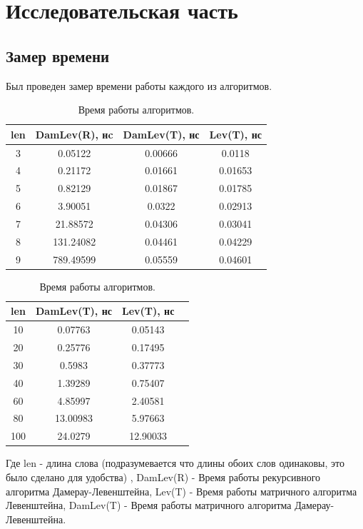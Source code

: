 \documentclass[12pt]{report}
\begin{document}
    \chapter{Исследовательская часть}
    
    \section{Замер времени}
    
    Был проведен замер времени работы каждого из алгоритмов.
    
   \begin{table}[h]
   	\caption{\label{tab:time1} Время работы алгоритмов. }
   	\begin{center}
   		\begin{tabular}{|c|c|c|c|}
    		\hline
    		len & DamLev(R), нc & DamLev(T), нс & Lev(T), нс \\ [0.5ex] 
    		\hline
    		3 & 0.05122 & 0.00666 & 0.0118\\
    		\hline
    		4 & 0.21172 & 0.01661 & 0.01653\\
    		\hline
    		5 & 0.82129 & 0.01867 & 0.01785\\
    		\hline
    		6 & 3.90051 & 0.0322 & 0.02913\\
    		\hline
    		7 & 21.88572 & 0.04306 & 0.03041\\
    		\hline
    		8 & 131.24082 & 0.04461 & 0.04229\\
    		\hline
    		9 & 789.49599 & 0.05559 & 0.04601\\
    		\hline
    	\end{tabular}
    \end{center}
\end{table}


\begin{table}[h]
	\caption{\label{tab:time2} Время работы алгоритмов. }
	\begin{center}
		\begin{tabular}{|c|c|c|c|}
			\hline
			len & DamLev(T), нс & Lev(T), нс \\ [0.5ex] 
			\hline
			10 & 0.07763 & 0.05143\\
			\hline
			20 & 0.25776 & 0.17495\\
			\hline
			30 & 0.5983 & 0.37773\\
			\hline
			40 & 1.39289 & 0.75407\\
			\hline
			60 & 4.85997 & 2.40581\\
			\hline
			80 & 13.00983 & 5.97663\\
			\hline
			100 & 24.0279 & 12.90033\\
			\hline
		\end{tabular}
	\end{center}
\end{table}
    Где len - длина слова (подразумевается что длины обоих слов одинаковы, это было сделано для удобства) , DamLev(R) - Время работы рекурсивного алгоритма Дамерау-Левенштейна, Lev(T) - Время работы матричного алгоритма Левенштейна, DamLev(T) - Время работы матричного алгоритма Дамерау-Левенштейна.
    
\end{document}
